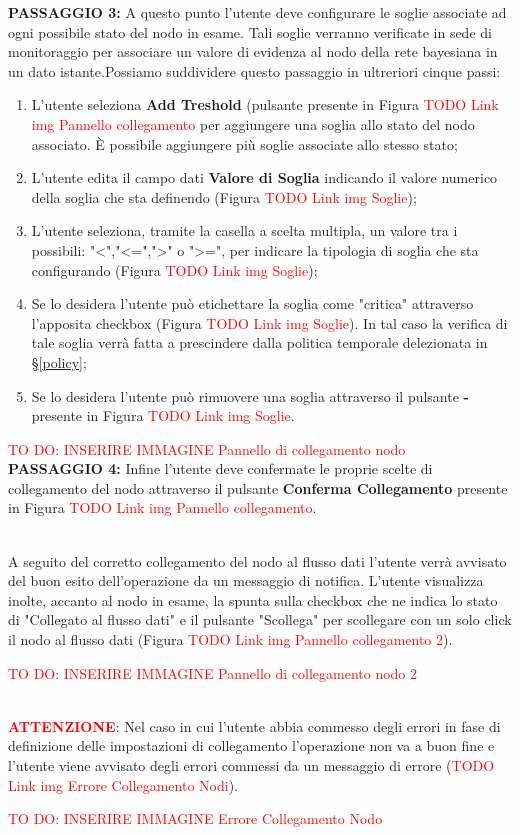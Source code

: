\textbf{PASSAGGIO 3:} A questo punto l'utente deve configurare le soglie associate ad ogni possibile stato del nodo in esame. Tali soglie verranno verificate in sede di monitoraggio per associare un valore di evidenza al nodo della rete bayesiana in un dato istante.Possiamo suddividere questo passaggio in ultreriori cinque passi:
\begin{enumerate}
	\item L'utente seleziona \textbf{Add Treshold} (pulsante presente in Figura \textcolor{red}{TODO Link img Pannello collegamento} per aggiungere una soglia allo stato del nodo associato. È possibile aggiungere più soglie associate allo stesso stato;
	\item L'utente edita il campo dati \textbf{Valore di Soglia} indicando il valore numerico della soglia che sta definendo (Figura \textcolor{red}{TODO Link img Soglie});
	\item L'utente seleziona, tramite la casella a scelta multipla, un valore tra i possibili: "<","<=",">" o ">=", per indicare la tipologia di soglia che sta configurando (Figura \textcolor{red}{TODO Link img Soglie});
	\item Se lo desidera l'utente può etichettare la soglia come "critica" attraverso l'apposita checkbox (Figura \textcolor{red}{TODO Link img Soglie}). In tal caso la verifica di tale soglia verrà fatta a prescindere dalla politica temporale delezionata in §\ref{policy};
	\item Se lo desidera l'utente può rimuovere una soglia attraverso il pulsante \textbf{-} presente in Figura \textcolor{red}{TODO Link img Soglie}.
\end{enumerate}

\textcolor{red}{TO DO: INSERIRE IMMAGINE Pannello di collegamento nodo}
~\\

\textbf{PASSAGGIO 4:} Infine l'utente deve confermate le proprie scelte di collegamento del nodo attraverso il pulsante \textbf{Conferma Collegamento} presente in Figura \textcolor{red}{TODO Link img Pannello collegamento}.

~\\
A seguito del corretto collegamento del nodo al flusso dati l'utente verrà avvisato del buon esito dell'operazione da un messaggio di notifica. L'utente visualizza inolte, accanto al nodo in esame, la spunta sulla checkbox che ne indica lo stato di "Collegato al flusso dati" e il pulsante "Scollega" per scollegare con un solo click il nodo al flusso dati (Figura \textcolor{red}{TODO Link img Pannello collegamento 2}).

\textcolor{red}{TO DO: INSERIRE IMMAGINE Pannello di collegamento nodo 2}

~\\
\textbf{\textcolor{red}{ATTENZIONE}}: Nel caso in cui l'utente abbia commesso degli errori in fase di definizione delle impostazioni di collegamento l'operazione non va a buon fine e l'utente viene avvisato degli errori commessi da un messaggio di errore (\textcolor{red}{TODO Link img Errore Collegamento Nodi}).

\textcolor{red}{TO DO: INSERIRE IMMAGINE Errore Collegamento Nodo}
 
